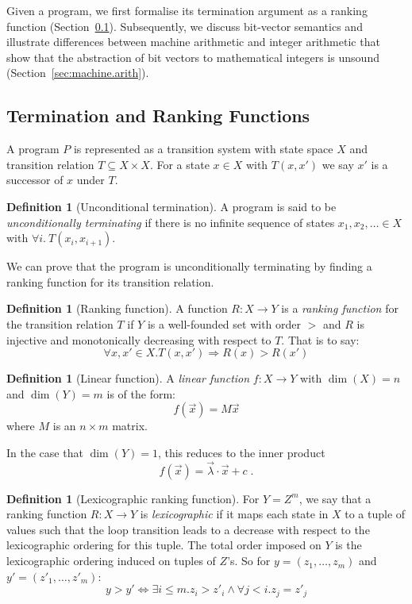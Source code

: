 \documentclass[preprint]{sigplanconf}
\theoremstyle{definition}
\newtheorem{definition}[theorem]{Definition}
\begin{document}
Given a program, we first formalise its termination argument as a ranking
function (Section~\ref{sec:ranking.functions}).  Subsequently, we discuss
bit-vector semantics and illustrate differences between machine arithmetic
and integer arithmetic that show that the abstraction of bit vectors to
mathematical integers is unsound (Section~\ref{sec:machine.arith}).

\subsection{Termination and Ranking Functions} \label{sec:ranking.functions}

A program $P$ is represented as a transition system with state space $X$ and
transition relation $T \subseteq X \times X$.  For a state
$x \in X$ with $T(x,x')$ we say $x'$ is a successor of $x$ under $T$.

\begin{definition}[Unconditional termination]
%
A program is said to be \emph{unconditionally terminating} if
there is no infinite sequence of states $x_1, x_2, \ldots \in X$ with
$\forall i.~T(x_i, x_{i+1})$.
%
\end{definition}

We can prove that the program is unconditionally terminating by
finding a ranking function for its transition relation.
%
\begin{definition}[Ranking function]
%
A function ${R:X\to Y}$ is a \emph{ranking function} for the
transition relation $T$ if $Y$ is a well-founded set with order $>$ and 
$R$ is injective and monotonically decreasing with respect to $T$.  That is
to say:
$$\forall x, x' \in X. T(x, x') \Rightarrow R(x) > R(x')$$
%
\end{definition}

\begin{definition}[Linear function]
A \emph{linear function} $f: X \to Y$ 
with $\dim(X) = n$ and $\dim(Y) = m$ is of the form: $$f(\vec{x}) = M\vec{x}$$ where
$M$ is an $n \times m$ matrix.
\end{definition}

In the case that $\dim(Y) = 1$, this reduces to the inner product
%
$$f(\vec{x}) = \vec{\lambda} \cdotp \vec{x} + c \;.$$

\begin{definition}[Lexicographic ranking function]
For $Y = Z^m$, we say that a ranking function $R: X \to Y$ is \emph{lexicographic}
if it maps each state in $X$ to a tuple of values such that the loop transition leads to a decrease with
respect to the lexicographic ordering for this tuple.
The total order imposed on $Y$ is the lexicographic ordering
induced on tuples of $Z$'s.  So for $y = (z_1, \ldots, z_m)$ and
$y' = (z'_1, \ldots, z'_m)$:
\[
 y > y' \iff \exists i \leq m . z_i > z'_i \wedge \forall j < i . z_j = z'_j
\]


\end{definition}
\end{document}
